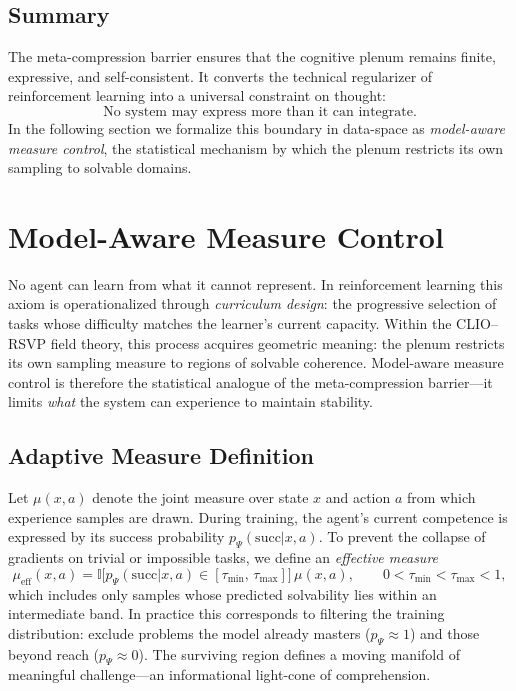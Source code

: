 \documentclass[11pt]{article}
\begin{document}
\subsection{Summary}

The meta-compression barrier ensures that the cognitive plenum remains finite, expressive, and self-consistent.  
It converts the technical regularizer of reinforcement learning into a universal constraint on thought:  
\[
\text{No system may express more than it can integrate.}
\]
In the following section we formalize this boundary in data-space as \emph{model-aware measure control}, the statistical mechanism by which the plenum restricts its own sampling to solvable domains.

\section{Model-Aware Measure Control}
No agent can learn from what it cannot represent.  
In reinforcement learning this axiom is operationalized through \emph{curriculum design}: the progressive selection of tasks whose difficulty matches the learner’s current capacity.  
Within the CLIO–RSVP field theory, this process acquires geometric meaning: the plenum restricts its own sampling measure to regions of solvable coherence.  
Model-aware measure control is therefore the statistical analogue of the meta-compression barrier—it limits \emph{what} the system can experience to maintain stability.

\subsection{Adaptive Measure Definition}

Let $\mu(x,a)$ denote the joint measure over state $x$ and action $a$ from which experience samples are drawn.  
During training, the agent’s current competence is expressed by its success probability 
$p_\Psi(\mathrm{succ}|x,a)$.  
To prevent the collapse of gradients on trivial or impossible tasks, we define an \emph{effective measure}
\[
\mu_{\mathrm{eff}}(x,a)
=
\mathbb{I}\!\big[p_\Psi(\mathrm{succ}|x,a)
\in [\tau_{\min},\,\tau_{\max}]\big]\,
\mu(x,a),
\qquad
0<\tau_{\min}<\tau_{\max}<1,
\]
which includes only samples whose predicted solvability lies within an intermediate band.  
In practice this corresponds to filtering the training distribution:  
exclude problems the model already masters ($p_\Psi\!\approx\!1$) and those beyond reach ($p_\Psi\!\approx\!0$).  
The surviving region defines a moving manifold of meaningful challenge—an informational light-cone of comprehension.
\end{document}
